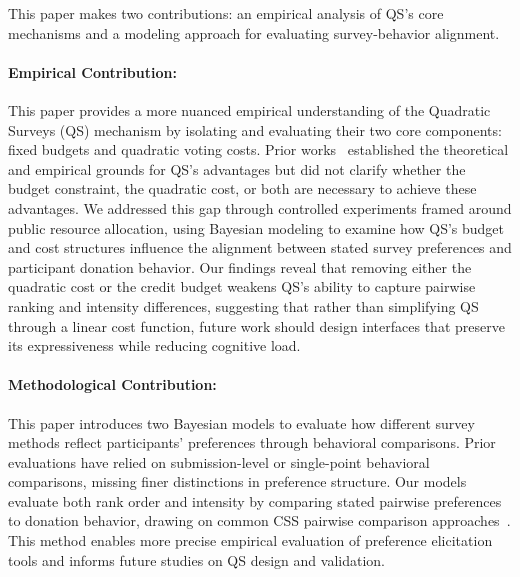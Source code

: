 
This paper makes two contributions: an empirical analysis of QS's core mechanisms and a modeling approach for evaluating survey-behavior alignment.

\paragraph{Empirical Contribution: } 
This paper provides a more nuanced empirical understanding of the Quadratic Surveys (QS) mechanism by isolating and evaluating their two core components: fixed budgets and quadratic voting costs. Prior works~\cite{georgescuFixedbudgetMultipleissueQuadratic2024, eguia2019quadratic, quarfoot2017quadratic, chengCanShowWhat2021} established the theoretical and empirical grounds for QS's advantages but did not clarify whether the budget constraint, the quadratic cost, or both are necessary to achieve these advantages. We addressed this gap through controlled experiments framed around public resource allocation, using Bayesian modeling to examine how QS's budget and cost structures influence the alignment between stated survey preferences and participant donation behavior. Our findings reveal that removing either the quadratic cost or the credit budget weakens QS's ability to capture pairwise ranking and intensity differences, suggesting that rather than simplifying QS through a linear cost function, future work should design interfaces that preserve its expressiveness while reducing cognitive load.

\paragraph{Methodological Contribution:}
This paper introduces two Bayesian models to evaluate how different survey methods reflect participants' preferences through behavioral comparisons. Prior evaluations have relied on submission-level or single-point behavioral comparisons, missing finer distinctions in preference structure. Our models evaluate both rank order and intensity by comparing stated pairwise preferences to donation behavior, drawing on common CSS pairwise comparison approaches~\cite{collewet2023preference, hauserIntensityMeasuresConsumer1980a}. This method enables more precise empirical evaluation of preference elicitation tools and informs future studies on QS design and validation.


